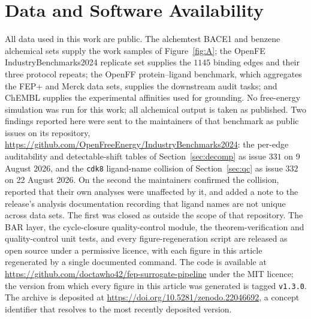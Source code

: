 \documentclass[11pt]{article}
\theoremstyle{plain}
\theoremstyle{remark}
\begin{document}
\section*{Data and Software Availability}
All data used in this work are public. The alchemtest BACE1 and benzene alchemical sets supply the
work samples of Figure~\ref{fig:A}; the OpenFE IndustryBenchmarks2024 replicate set supplies the
$1145$ binding edges and their three protocol repeats; the OpenFF protein--ligand benchmark, which
aggregates the FEP+ and Merck data sets, supplies the downstream audit tasks; and ChEMBL supplies
the experimental affinities used for grounding. No free-energy simulation was run for this work;
all alchemical output is taken as published.
Two findings reported here were sent to the maintainers of that benchmark as public issues on its
repository, \url{https://github.com/OpenFreeEnergy/IndustryBenchmarks2024}: the per-edge
auditability and detectable-shift tables of Section~\ref{sec:decomp} as issue $331$ on 9 August
2026, and the \texttt{cdk8} ligand-name collision of Section~\ref{sec:qc} as issue $332$ on
22 August 2026. On the second the maintainers confirmed the collision, reported that their own
analyses were unaffected by it, and added a note to the release's analysis documentation recording
that ligand names are not unique across data sets. The first was closed as outside the scope of
that repository.
The BAR layer, the cycle-closure quality-control module, the theorem-verification and
quality-control unit tests, and every figure-regeneration script are released as open source under
a permissive licence, with each figure in this article regenerated by a single documented command.
The code is available at \url{https://github.com/doctawho42/fep-surrogate-pipeline} under the
MIT licence; the version from which every figure in this article was generated is tagged
\texttt{v1.3.0}.
The archive is deposited at \url{https://doi.org/10.5281/zenodo.22046692}, a concept identifier
that resolves to the most recently deposited version.

\clearpage


\end{document}
